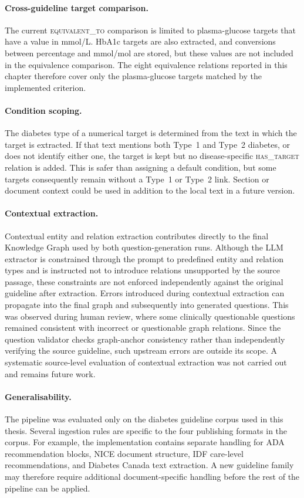 \paragraph{Cross-guideline target comparison.}
The current \textsc{equivalent\_to} comparison is limited to
plasma-glucose targets that have a value in mmol/L. HbA1c targets are
also extracted, and conversions between percentage and mmol/mol are
stored, but these values are not included in the equivalence comparison.
The eight equivalence relations reported in this chapter therefore cover
only the plasma-glucose targets matched by the implemented criterion.

\paragraph{Condition scoping.}
The diabetes type of a numerical target is determined from the text in
which the target is extracted. If that text mentions both Type~1 and
Type~2 diabetes, or does not identify either one, the target is kept but
no disease-specific \textsc{has\_target} relation is added. This is safer
than assigning a default condition, but some targets consequently remain
without a Type~1 or Type~2 link. Section or document context could be used
in addition to the local text in a future version.

\paragraph{Contextual extraction.}

Contextual entity and relation extraction contributes directly to the final Knowledge Graph used by both question-generation runs. Although the LLM extractor is constrained through the prompt to predefined entity and relation types and is instructed not to introduce relations unsupported by the source passage, these constraints are not enforced independently against the original guideline after extraction. Errors introduced during contextual extraction can propagate into the final graph and subsequently into generated questions. This was observed during human review, where some clinically questionable questions remained consistent with incorrect or questionable graph relations. Since the question validator checks graph-anchor consistency rather than independently verifying the source guideline, such upstream errors are outside its scope. A systematic source-level evaluation of contextual extraction was not carried out and remains future work.

\paragraph{Generalisability.}
The pipeline was evaluated only on the diabetes guideline corpus used in
this thesis. Several ingestion rules are specific to the four publishing
formats in the corpus. For example, the implementation contains separate
handling for ADA recommendation blocks, NICE document structure, IDF
care-level recommendations, and Diabetes Canada text extraction. A new
guideline family may therefore require additional document-specific
handling before the rest of the pipeline can be applied.